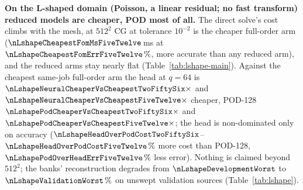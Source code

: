 \textbf{On the L-shaped domain (Poisson, a linear residual; no fast
transform) reduced models are cheaper, POD most of all.} The direct solve's cost climbs with the mesh, at
$512^2$ CG at tolerance $10^{-2}$ is the cheaper full-order arm ($\nLshapeCheapestFomMsFiveTwelve$\,ms
at $\nLshapeCheapestFomErrFiveTwelve\,\%$, more accurate than any reduced
arm), and the reduced arms stay nearly flat (Table~\ref{tab:lshape-main}). Against the cheapest same-job full-order arm the head at $q=64$ is
$\nLshapeNeuralCheaperVsCheapestTwoFiftySix\times$ and
$\nLshapeNeuralCheaperVsCheapestFiveTwelve\times$ cheaper, POD-128
$\nLshapePodCheaperVsCheapestTwoFiftySix\times$ and
$\nLshapePodCheaperVsCheapestFiveTwelve\times$; the head is non-dominated
only on accuracy
($\nLshapeHeadOverPodCostTwoFiftySix$--$\nLshapeHeadOverPodCostFiveTwelve\,\%$
more cost than POD-128, $\nLshapePodOverHeadErrFiveTwelve\,\%$ less error).
Nothing is claimed beyond $512^2$; the banks' reconstruction degrades from
$\nLshapeDevelopmentWorst$ to $\nLshapeValidationWorst\,\%$ on unswept
validation sources (Table~\ref{tab:lshape}).

